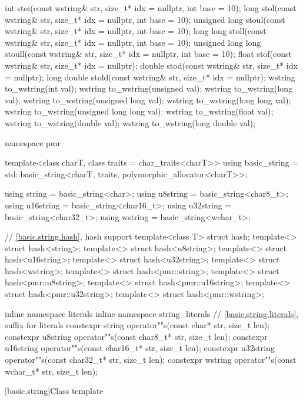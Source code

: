 \begin{codeblock}
{  int stoi(const wstring& str, size_t* idx = nullptr, int base = 10);
  long stol(const wstring& str, size_t* idx = nullptr, int base = 10);
  unsigned long stoul(const wstring& str, size_t* idx = nullptr, int base = 10);
  long long stoll(const wstring& str, size_t* idx = nullptr, int base = 10);
  unsigned long long stoull(const wstring& str, size_t* idx = nullptr, int base = 10);
  float stof(const wstring& str, size_t* idx = nullptr);
  double stod(const wstring& str, size_t* idx = nullptr);
  long double stold(const wstring& str, size_t* idx = nullptr);
  wstring to_wstring(int val);
  wstring to_wstring(unsigned val);
  wstring to_wstring(long val);
  wstring to_wstring(unsigned long val);
  wstring to_wstring(long long val);
  wstring to_wstring(unsigned long long val);
  wstring to_wstring(float val);
  wstring to_wstring(double val);
  wstring to_wstring(long double val);

  namespace pmr {
    template<class charT, class traits = char_traits<charT>>
      using basic_string = std::basic_string<charT, traits, polymorphic_allocator<charT>>;

    using string    = basic_string<char>;
    using u8string  = basic_string<char8_t>;
    using u16string = basic_string<char16_t>;
    using u32string = basic_string<char32_t>;
    using wstring   = basic_string<wchar_t>;
  }

  // \ref{basic.string.hash}, hash support
  template<class T> struct hash;
  template<> struct hash<string>;
  template<> struct hash<u8string>;
  template<> struct hash<u16string>;
  template<> struct hash<u32string>;
  template<> struct hash<wstring>;
  template<> struct hash<pmr::string>;
  template<> struct hash<pmr::u8string>;
  template<> struct hash<pmr::u16string>;
  template<> struct hash<pmr::u32string>;
  template<> struct hash<pmr::wstring>;

  inline namespace literals {
  inline namespace string_literals {
    // \ref{basic.string.literals}, suffix for  literals
    constexpr string    operator""s(const char* str, size_t len);
    constexpr u8string  operator""s(const char8_t* str, size_t len);
    constexpr u16string operator""s(const char16_t* str, size_t len);
    constexpr u32string operator""s(const char32_t* str, size_t len);
    constexpr wstring   operator""s(const wchar_t* str, size_t len);
  }
  }
}
\end{codeblock}

[basic.string]{Class template }

